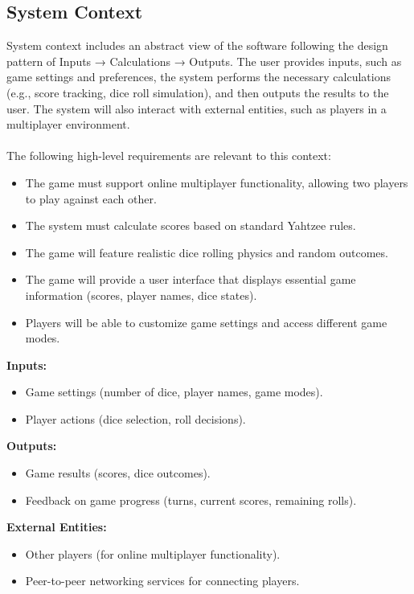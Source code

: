 \subsection{System Context}

System context includes an abstract view of the software following the design pattern of Inputs → Calculations → Outputs. The user provides inputs, such as game settings and preferences, the system performs the necessary calculations (e.g., score tracking, dice roll simulation), and then outputs the results to the user. The system will also interact with external entities, such as players in a multiplayer environment.\\
\\
\noindent The following high-level requirements are relevant to this context:

\begin{itemize}
    \item The game must support online multiplayer functionality, allowing two players to play against each other.
    \item The system must calculate scores based on standard Yahtzee rules.
    \item The game will feature realistic dice rolling physics and random outcomes.
    \item The game will provide a user interface that displays essential game information (scores, player names, dice states).
    \item Players will be able to customize game settings and access different game modes.
\end{itemize}

\noindent\textbf{Inputs:}
  \begin{itemize}
        \item Game settings (number of dice, player names, game modes).
        \item Player actions (dice selection, roll decisions).
  \end{itemize}
  
  \noindent\textbf{Outputs:}
  \begin{itemize}
      \item Game results (scores, dice outcomes).
      \item Feedback on game progress (turns, current scores, remaining rolls).
  \end{itemize}
  
  \noindent\textbf{External Entities:}
  \begin{itemize}
      \item Other players (for online multiplayer functionality).
      \item Peer-to-peer networking services for connecting players.
  \end{itemize}

